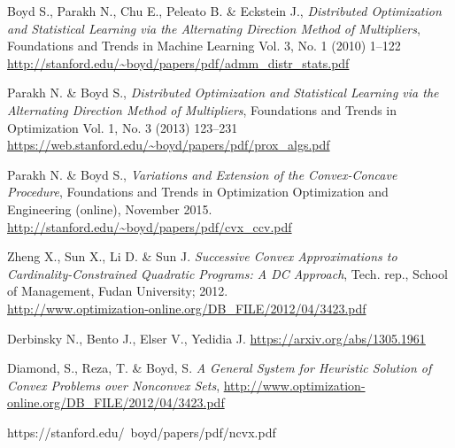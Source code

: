 \documentclass{article}
\begin{document}
\begin{thebibliography}{20}


  Boyd S., Parakh N., Chu E., Peleato B. \& Eckstein J.,
  \emph{Distributed Optimization and Statistical Learning via the
  Alternating Direction Method of Multipliers},
Foundations and Trends in Machine Learning
Vol. 3, No. 1 (2010) 1–122 \\
{\url{http://stanford.edu/~boyd/papers/pdf/admm_distr_stats.pdf}}

  Parakh N. \& Boyd S.,
  \emph{Distributed Optimization and Statistical Learning via the
  Alternating Direction Method of Multipliers},
Foundations and Trends in Optimization
Vol. 1, No. 3 (2013) 123–231 \\
{\url{https://web.stanford.edu/~boyd/papers/pdf/prox_algs.pdf}}

  Parakh N. \& Boyd S.,
  \emph{Variations and Extension of the Convex-Concave Procedure},
Foundations and Trends in Optimization
Optimization and Engineering (online), November 2015.\\
{\url{http://stanford.edu/~boyd/papers/pdf/cvx_ccv.pdf}}

  Zheng X., Sun  X., Li D. \& Sun J.
  \emph{Successive Convex Approximations to Cardinality-Constrained
  Quadratic Programs: A DC Approach},
  Tech. rep., School of Management, Fudan University; 2012.\\
{\url{http://www.optimization-online.org/DB_FILE/2012/04/3423.pdf}}

Derbinsky N., Bento J., Elser V., Yedidia J.
{\url{https://arxiv.org/abs/1305.1961}}


  Diamond, S., Reza, T. \& Boyd, S.
  \emph{A General System for Heuristic Solution of Convex Problems over Nonconvex Sets},
{\url{http://www.optimization-online.org/DB_FILE/2012/04/3423.pdf}}

https://stanford.edu/~boyd/papers/pdf/ncvx.pdf

\end{thebibliography}
\end{document}
